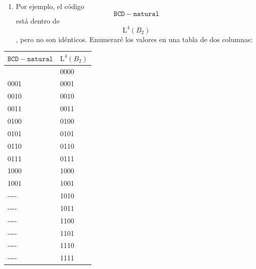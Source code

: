 \begin{enumerate}
\begin{enumerate}
    A este último lo suelo llamar código saturado de
    longitud\[\mathtt{\mathrm{n}}\]sobre el
    alfabeto\[\mathtt{\mathrm{A}}\], y será la referencia para los
    distintos códigos de longitud fija. Para un código de este tipo el
    número de palabras máximo permitido será
    \[\left( \mathtt{\mathrm{\# A}} \right)^{\mathtt{\mathrm{n}}}\]. Si
    trabajamos en binario natural de longitud fija
    \[\mathtt{\mathrm{n}}\], representaremos desde el
    \[\mathtt{\mathrm{0}}\] al
    \[\mathtt{\mathrm{2}}^{\mathtt{\mathrm{n}}} - \mathtt{\mathrm{1}}\].
  \item
    Por ejemplo, el código \[\mathtt{{BCD} - {natural}}\]está dentro de
    \[\mathtt{\mathrm{L}}^{\mathbf{\mathrm{\mathtt{\mathrm{4}}}}}\left( B_{\mathbf{\mathrm{\mathtt{\mathrm{2}}}}} \right)\],
    pero no son idénticos. Enumeraré los valores en una tabla de dos
    columnas:
  \end{enumerate}
\end{enumerate}

{\def\LTcaptype{none} %
\begin{longtable}{@{}ll@{}}
\toprule\noalign{}
\(\mathtt{{BCD} - {natural}}\) &
\(\mathtt{\mathrm{L}}^{\mathbf{\mathrm{\mathtt{\mathrm{4}}}}}\left( B_{\mathbf{\mathrm{\mathtt{\mathrm{2}}}}} \right)\) \\
\midrule\noalign{}
\endhead
\bottomrule\noalign{}
\endlastfoot
0000 & 0000 \\
0001 & 0001 \\
0010 & 0010 \\
0011 & 0011 \\
0100 & 0100 \\
0101 & 0101 \\
0110 & 0110 \\
0111 & 0111 \\
1000 & 1000 \\
1001 & 1001 \\
-\/-\/-\/- & 1010 \\
-\/-\/-\/- & 1011 \\
-\/-\/-\/- & 1100 \\
-\/-\/-\/- & 1101 \\
-\/-\/-\/- & 1110 \\
-\/-\/-\/- & 1111 \\
\end{longtable}
}

